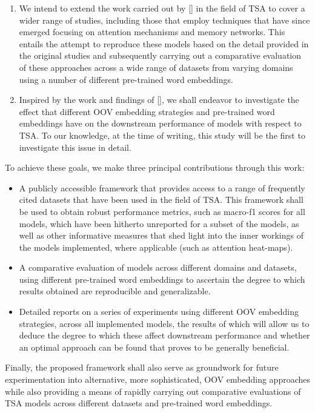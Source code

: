 \documentclass[12pt, a4paper]{report}
\theoremstyle{definition}
\theoremstyle{definition}%
\theoremstyle{definition}%
\theoremstyle{definition}%
\theoremstyle{definition}%
\theoremstyle{definition}%
\renewcommand{\cite}[1]{[\citealp{#1}]}
\begin{document}
\begin{enumerate}
    \item We intend to extend the work carried out by \cite{moore2018} in the field of TSA to cover a wider range of studies, including those that employ techniques that have since emerged focusing on attention mechanisms and memory networks. This entails the attempt to reproduce these models based on the detail provided in the original studies and subsequently carrying out a comparative evaluation of these approaches across a wide range of datasets from varying domains using a number of different pre-trained word embeddings.
    \item Inspired by the work and findings of \cite{bhuwandhingra2017}, we shall endeavor to investigate the effect that different OOV embedding strategies and pre-trained word embeddings have on the downstream performance of models with respect to TSA. To our knowledge, at the time of writing, this study will be the first to investigate this issue in detail.
\end{enumerate}

To achieve these goals, we make three principal contributions through this work:
\begin{itemize}
    \item A publicly accessible framework that provides access to a range of frequently cited datasets that have been used in the field of TSA. This framework shall be used to obtain robust performance metrics, such as macro-f1 scores for all models, which have been hitherto unreported for a subset of the models, as well as other informative measures that shed light into the inner workings of the models implemented, where applicable (such as attention heat-maps). 
    \item A comparative evaluation of models across different domains and datasets, using different pre-trained word embeddings to ascertain the degree to which results obtained are reproducible and generalizable. 
    \item Detailed reports on a series of experiments using different OOV embedding strategies, across all implemented models, the results of which will allow us to deduce the degree to which these affect downstream performance and whether an optimal approach can be found that proves to be generally beneficial. 
\end{itemize}

Finally, the proposed framework shall also serve as groundwork for future experimentation into alternative, more sophisticated, OOV embedding approaches while also providing a means of rapidly carrying out comparative evaluations of TSA models across different datasets and pre-trained word embeddings.  
\end{document}
